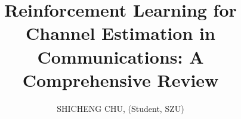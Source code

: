 \documentclass[journal,twocolumn]{IEEEtran}
\begin{document}
%
\title{Reinforcement Learning for Channel Estimation in Communications: A Comprehensive Review}
%
%
\author{SHICHENG CHU, (Student, SZU)%
}

%
%



%
\end{document}
